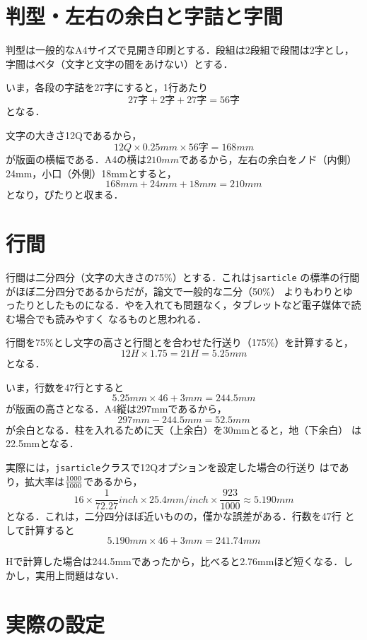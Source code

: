 \documentclass[a4j, 12Q, twocolumn, twoside]{jsarticle}
\begin{document}
\section{判型・左右の余白と字詰と字間}

  判型は一般的なA4サイズで見開き印刷とする．段組は2段組で段間は2字とし，
  字間はベタ（文字と文字の間をあけない）とする．

  いま，各段の字詰を27字にすると，1行あたり
  \[
   27字 + 2字 + 27字 = 56字
  \]
  となる．

  文字の大きさ12Qであるから，
  \[
   12Q \times 0.25 mm \times 56字 = 168 mm
  \]
  が版面の横幅である．A4の横は$210mm$であるから，左右の余白をノド（内側）
  24mm，小口（外側）18mmとすると，
  \[
   168mm + 24mm + 18mm = 210mm
  \]
  となり，ぴたりと収まる．

\section{行間}
  行間は二分四分（文字の大きさの75\%）とする．これは\texttt{jsarticle}
  の標準の行間がほぼ二分四分であるからだが，論文で一般的な二分（50\%）
  よりもわりとゆったりとしたものになる．やを入れても問題なく，タブレットなど電子媒体で読む場合でも読みやすく
  なるものと思われる．

  行間を75\%とし文字の高さと行間とを合わせた行送り（175\%）を計算すると，
  \[
   12H \times 1.75 = 21H = 5.25 mm
  \]
  となる．

  いま，行数を47行とすると
  \[
   5.25 mm \times 46 + 3mm = 244.5mm
  \]
  が版面の高さとなる．A4縦は297mmであるから，
  \[
   297mm - 244.5mm = 52.5mm
  \]
  が余白となる．柱を入れるために天（上余白）を30mmとると，地（下余白）
  は22.5mmとなる．

  実際には，\texttt{jsarticle}クラスで12Qオプションを設定した場合の行送り
  は\the\baselineskip であり，拡大率は$\frac{\the\mag}{1000}$であるから，
  \[
    16 \times \frac{1}{72.27} inch \times 25.4 mm/inch \times
    \frac{923}{1000} \approx 5.190 mm
  \]
  となる．これは，二分四分ほぼ近いものの，僅かな誤差がある．行数を47行
  として計算すると
  \[
   5.190 mm \times 46 + 3mm = 241.74mm
  \]

  Hで計算した場合は244.5mmであったから，比べると2.76mmほど短くなる．し
  かし，実用上問題はない．
  
\section{実際の設定}
\end{document}

